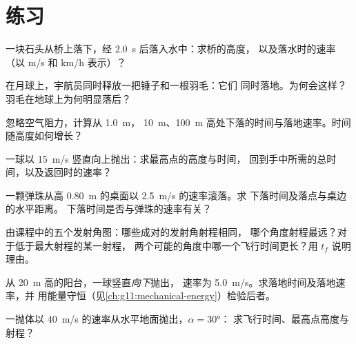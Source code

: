 \section{练习}

\begin{exercise}[$\star$]\label{exo:g12:projectile-motion:1}
一块石头从桥上落下，经 \qty{2.0}{s} 后落入水中：求桥的高度，
以及落水时的速率（以 \unit{m/s} 和 \unit{km/h} 表示）？
\end{exercise}

\begin{exercise}[$\star$]\label{exo:g12:projectile-motion:2}
在月球上，宇航员同时释放一把锤子和一根羽毛：它们
同时落地。为何会这样？羽毛在地球上为何明显落后？
\end{exercise}

\begin{exercise}[$\star$]\label{exo:g12:projectile-motion:3}
忽略空气阻力，计算从 \qty{1.0}{m}，
\qty{10}{m}、\qty{100}{m} 高处下落的时间与落地速率。时间随高度如何增长？
\end{exercise}

\begin{exercise}[$\star$]\label{exo:g12:projectile-motion:4}
一球以 \qty{15}{m/s} 竖直向上抛出：求最高点的高度与时间，
回到手中所需的总时间，以及返回时的速率？
\end{exercise}

\begin{exercise}[$\star$]\label{exo:g12:projectile-motion:5}
一颗弹珠从高 \qty{0.80}{m} 的桌面以 \qty{2.5}{m/s} 的速率滚落。求
下落时间及落点与桌边的水平距离。
下落时间是否与弹珠的速率有关？
\end{exercise}

\begin{exercise}[$\star\star$]\label{exo:g12:projectile-motion:6}
由课程中的五个发射角图：哪些成对的发射角射程相同，
哪个角度射程最远？对于低于最大射程的某一射程，
两个可能的角度中哪一个飞行时间更长？用 $t_f$ 说明理由。
\end{exercise}

\begin{exercise}[$\star\star$]\label{exo:g12:projectile-motion:7}
从 \qty{20}{m} 高的阳台，一球竖直\emph{向下}抛出，
速率为 \qty{5.0}{m/s}。求落地时间及落地速率，并
用能量守恒（见\cref{ch:g11:mechanical-energy}）检验后者。
\end{exercise}

\begin{exercise}[$\star\star$]\label{exo:g12:projectile-motion:8}
一抛体以 \qty{40}{m/s} 的速率从水平地面抛出，$\alpha = \ang{30}$：
求飞行时间、最高点高度与射程？
\end{exercise}

